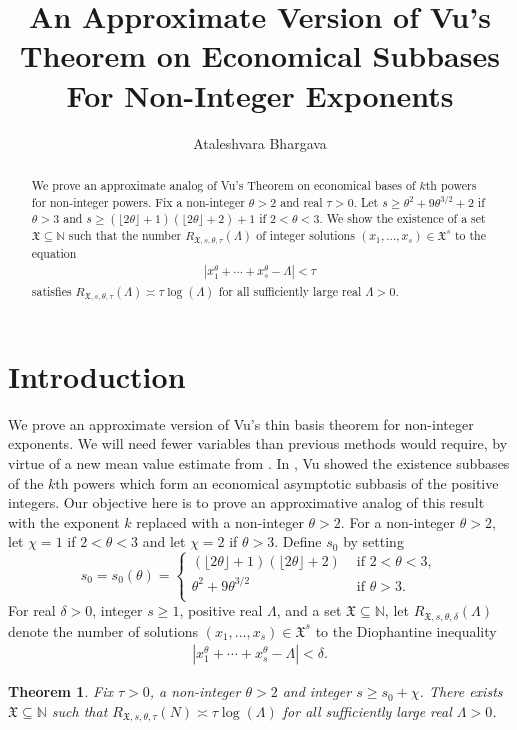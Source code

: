 \documentclass[11pt,reqno]{amsart}
\title[An Approximate Version of Vu's Theorem]{An Approximate Version of Vu's Theorem on Economical Subbases For Non-Integer Exponents}
\author{Ataleshvara Bhargava}
\numberwithin{equation}{section}
\newtheorem{theorem}{Theorem}[section]
\begin{document}
\begin{abstract} We prove an approximate analog of Vu's Theorem on economical bases of $k$th powers for non-integer powers.
Fix a non-integer $\theta > 2$ and real $\tau > 0$. Let $s \geq \theta^2+9\theta^{3/2}+2 $ if $\theta > 3$ and $s \geq (\lfloor 2\theta \rfloor+1)(\lfloor 2\theta \rfloor+2)+1$ if $2 < \theta < 3$. We show the existence of a set $\mathfrak{X} \subseteq \mathbb{N}$ such that the number $R_{\mathfrak{X},s,\theta,\tau}(\Lambda)$ of integer solutions $(x_1,\ldots,x_s) \in \mathfrak{X}^s$ to the equation 
\begin{align*} 
|x_1^{\theta} +\cdots+ x_s^{\theta} - \Lambda| < \tau 
\end{align*}
satisfies $R_{\mathfrak{X},s,\theta,\tau}(\Lambda) \asymp \tau \log(\Lambda)$
for all sufficiently large real $\Lambda > 0$.
\vspace{-30pt}
\end{abstract}



\maketitle

\everymath{\displaystyle} 

\section{Introduction} We prove an approximate version of Vu's thin basis theorem for non-integer exponents. We will need fewer variables than previous methods would require, by virtue of a new mean value estimate from \cite{BharMVE}. In \cite{VuRef}, Vu showed the existence subbases of the $k$th powers which form an economical asymptotic subbasis of the positive integers. Our objective here is to prove an approximative analog of this result with the exponent $k$ replaced with a non-integer $\theta > 2$. For a non-integer $\theta > 2$, let $\chi =1$ if $2 < \theta < 3$ and let $\chi = 2$ if $\theta > 3$. Define $s_0$ by setting 
\[ s_0 = s_0(\theta) =\begin{cases} 
    (\lfloor 2\theta \rfloor+1)(\lfloor 2\theta \rfloor +2) &  \text{ if } 2 < \theta < 3, \\
    \theta^2+9\theta^{3/2} & \text{ if } \theta > 3. \\
\end{cases} 
\]
For real $\delta > 0$, integer $s \geq 1$, positive real $\Lambda$, and a set $\mathfrak{X} \subseteq \mathbb{N}$, let $R_{\mathfrak{X}, s,\theta,\delta}(\Lambda)$ denote the number of solutions $(x_1,\ldots,x_s) \in \mathfrak{X}^s$ 
to the Diophantine inequality 
\begin{align} \label{ineq:main}
|x_1^{\theta}+\cdots+x_s^{\theta}-\Lambda| < \delta. 
\end{align}
\begin{theorem} \label{thm:main} 
Fix $\tau > 0$, a non-integer $\theta > 2$ and integer $s \geq s_0+\chi$. There exists $\mathfrak{X} \subseteq \mathbb{N}$ such that  $R_{\mathfrak{X},s,\theta,\tau}(N) \asymp \tau \log(\Lambda)$ for all sufficiently large real $\Lambda > 0$. 
\end{theorem} 
\end{document}
